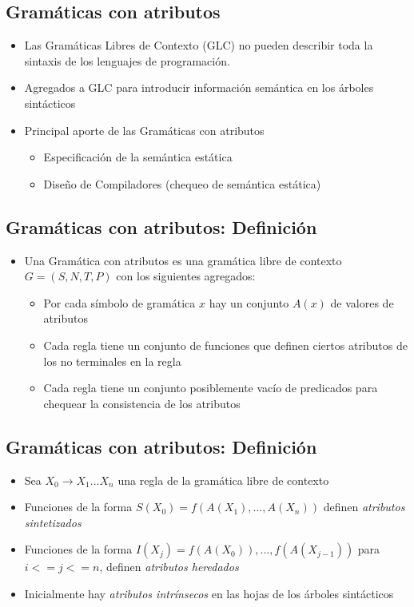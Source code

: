 \documentclass[11pt]{article}
\begin{document}
\subsection*{Gramáticas con atributos}
\label{sec:orgab65659}
\begin{itemize}
\item Las Gramáticas Libres de Contexto (GLC) no pueden describir toda la sintaxis de
los lenguajes de programación.
\item Agregados a GLC para introducir información semántica en los árboles sintácticos
\item Principal aporte de las Gramáticas con atributos
\begin{itemize}
\item Especificación de la semántica estática
\item Diseño de Compiladores (chequeo de semántica estática)
\end{itemize}
\end{itemize}

\subsection*{Gramáticas con atributos: Definición}
\label{sec:orgd4fb997}
\begin{itemize}
\item Una Gramática con atributos es una gramática libre de contexto \(G =
  (S,N,T,P)\) con los siguientes agregados:
\begin{itemize}
\item Por cada símbolo de gramática \(x\) hay un conjunto \(A(x)\) de
valores de atributos
\item Cada regla tiene un conjunto de funciones que definen ciertos
atributos de los no terminales en la regla
\item Cada regla tiene un conjunto posiblemente vacío de predicados para
chequear la consistencia de los atributos
\end{itemize}
\end{itemize}

\subsection*{Gramáticas con atributos: Definición}
\label{sec:org436f531}
\begin{itemize}
\item Sea \(X_0 \to X_1 ... X_n\) una regla de la gramática libre de contexto
\item Funciones de la forma \(S(X_0) = f(A(X_1), ... , A(X_n))\) definen
\emph{atributos sintetizados}
\item Funciones de la forma \(I(X_j) = f(A(X_0)), ... , f(A(X_{j-1}))\) para \(i
  <= j <= n\), definen \emph{atributos heredados}
\item Inicialmente hay \emph{atributos intrínsecos} en las hojas de los árboles sintácticos
\end{itemize}
\end{document}
